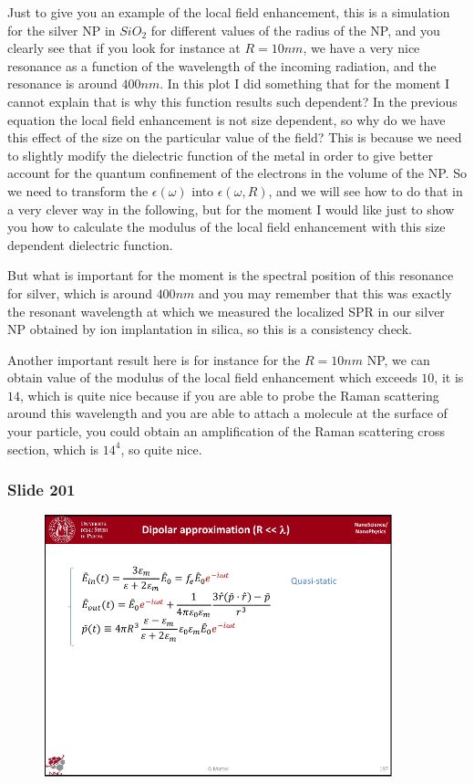 \documentclass[../main/main.tex]{subfiles}
\begin{document}
Just to give you an example of the local field enhancement, this is a simulation for the silver NP in $SiO_2$ for different values of the radius of the NP, and you clearly see that if you look for instance at $R=10 nm$, we have a very nice resonance as a function of the wavelength of the incoming radiation, and the resonance is around $400 nm$. In this plot I did something that for the moment I cannot explain that is why this function results such dependent? In the previous equation the local field enhancement is not size dependent, so why do we have this effect of the size on the particular value of the field? This is because we need to slightly modify the dielectric function of the metal in order to give better account for the quantum confinement of the electrons in the volume of the NP. So we need to transform the $\epsilon(\omega)$ into $\epsilon(\omega,R)$, and we will see how to do that in a very clever way in the following, but for the moment I would like just to show you how to calculate the modulus of the local field enhancement with this size dependent dielectric function.

But what is important for the moment is the spectral position of this resonance for silver, which is around $400 nm$ and you may remember that this was exactly the resonant wavelength at which we measured the localized SPR in our silver NP obtained by ion implantation in silica, so this is a consistency check.

Another important result here is for instance for the $R=10 nm$ NP, we can obtain value of the modulus of the local field enhancement which exceeds $10$, it is $14$, which is quite nice because if you are able to probe the Raman scattering around this wavelength and you are able to attach a molecule at the surface of your particle, you could obtain an amplification of the Raman scattering cross section, which is $14^4$, so quite nice.




\newpage

\subsubsection{Slide 201}

\begin{figure}[h!]
\centering
\includegraphics[page=5,width=0.9\textwidth]{../lessons/pdf_file/12_lesson.pdf}
\end{figure}
\end{document}
